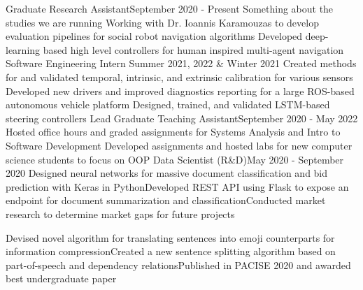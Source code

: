 \documentclass[letter]{article}
\begin{document}
        {Graduate Research Assistant}{September 2020 - Present}
        {Something about the studies we are running}
        {Working with Dr. Ioannis Karamouzas to develop evaluation pipelines for social robot navigation algorithms}
        {Developed deep-learning based high level controllers for human inspired multi-agent navigation}
\vspace{\interspace}
        {Software Engineering Intern}
        {Summer 2021, 2022 \& Winter 2021}
        {Created methods for and validated temporal, intrinsic, and extrinsic calibration for various sensors}
        {Developed new drivers and improved diagnostics reporting for a large ROS-based autonomous vehicle platform}
        {Designed, trained, and validated LSTM-based steering controllers}
\vspace{\interspace}
        {Lead Graduate Teaching Assistant}{September 2020 - May 2022}
        {Hosted office hours and graded assignments for Systems Analysis and Intro to Software Development}
        {Developed assignments and hosted labs for new computer science students to focus on OOP}
\vspace{\interspace}
        {Data Scientist (R\&D)}{May 2020 - September 2020}
        {Designed neural networks for massive document classification and bid prediction with Keras in Python}{Developed REST API using Flask to expose an endpoint for document summarization and classification}{Conducted market research to determine market gaps for future projects}
\vspace{\interspace}
\vspace{-\interspace}


            {Devised novel algorithm for translating sentences into emoji counterparts for information compression}{Created a new sentence splitting algorithm based on part-of-speech and dependency relations}{Published in PACISE 2020 and awarded best undergraduate paper}
\end{document}
